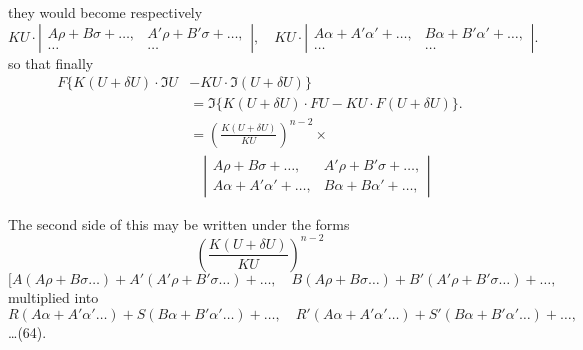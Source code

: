 \documentclass[11pt,a4paper]{article}
\theoremstyle{plain}
\theoremstyle{definition}
\theoremstyle{remark}
\begin{document}
\newpage
they would become respectively
\[
KU \cdot \left|\begin{array}{cc}
A\rho + B\sigma + \ldots, & A'\rho + B'\sigma + \ldots, \\
\ldots & \ldots
\end{array}\right|, \quad
KU \cdot \left|\begin{array}{cc}
A\alpha + A'\alpha' + \ldots, & B\alpha + B'\alpha' + \ldots, \\
\ldots & \ldots
\end{array}\right|
\tag{62}.
\]
so that finally
\begin{align*}
F\{K(U+\delta U) \cdot \mathfrak{I}U &- KU \cdot \mathfrak{I}(U+\delta U)\} \\
&= \mathfrak{I}\{K(U+\delta U) \cdot FU - KU \cdot F(U+\delta U)\} \tag{63}.\\
&= \left(\frac{K(U+\delta U)}{KU}\right)^{n-2} \times \\
&\quad \left|\begin{array}{cc}
A\rho + B\sigma + \ldots, & A'\rho + B'\sigma + \ldots, \\
A\alpha + A'\alpha' + \ldots, & B\alpha + B\alpha' + \ldots,
\end{array}\right|
\end{align*}

The second side of this may be written under the forms
\[
\left(\frac{K(U+\delta U)}{KU}\right)^{n-2}
\]
\[
[A(A\rho + B\sigma \ldots) + A'(A'\rho + B'\sigma \ldots) + \ldots, \quad
B(A\rho + B\sigma \ldots) + B'(A'\rho + B'\sigma \ldots) + \ldots,
\]
multiplied into
\[
R(A\alpha + A'\alpha' \ldots) + S(B\alpha + B'\alpha' \ldots) + \ldots, \quad
R'(A\alpha + A'\alpha' \ldots) + S'(B\alpha + B'\alpha' \ldots) + \ldots,
\]
\ldots (64).
\end{document}
